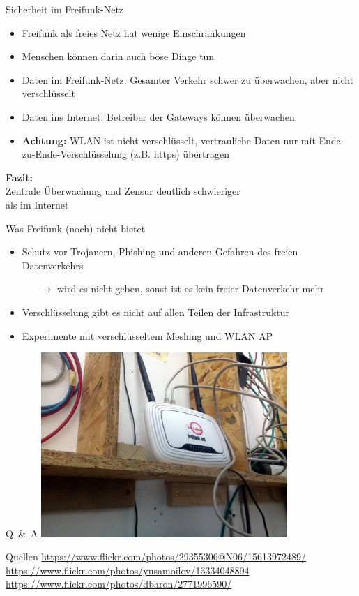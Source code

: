 \documentclass[10pt,handout]{beamer}
\begin{document}
\begin{frame}{Sicherheit im Freifunk-Netz}
	\begin{itemize}
		\pause\item Freifunk als freies Netz hat wenige Einschränkungen
		\pause\item Menschen können darin auch böse Dinge tun
		\vfill
		\pause\item Daten im Freifunk-Netz: Gesamter Verkehr schwer zu überwachen, aber nicht verschlüsselt
		\pause\item Daten ins Internet: Betreiber der Gateways können überwachen
		\vfill
		\pause\item \textbf{Achtung:} WLAN ist nicht verschlüsselt, vertrauliche Daten nur mit Ende-zu-Ende-Verschlüsselung (z.B. https) übertragen
		\vfill
	\end{itemize}
	\centering
	\textbf{Fazit:}\\Zentrale Überwachung und Zensur deutlich schwieriger \\ als im Internet
\end{frame}


\begin{frame}{Was Freifunk (noch) nicht bietet}
\vfill
\begin{itemize}
\pause\item Schutz vor Trojanern, Phishing und anderen Gefahren des freien Datenverkehrs
\begin{itemize}
\pause\item[$\rightarrow$] wird es nicht geben, sonst ist es kein freier Datenverkehr mehr
\end{itemize}
\vfill
\pause\item Verschlüsselung gibt es nicht auf allen Teilen der Infrastruktur
\vfill
\pause\item Experimente mit verschlüsseltem Meshing und WLAN AP
\end{itemize}
\vfill
\end{frame}

\begin{frame}{Q~\&~A}
\vfill
\centering
\includegraphics[width=0.7\textwidth]{images/irl_router}
\vfill
\end{frame}

\begin{frame}{Quellen}
\url{https://www.flickr.com/photos/29355306@N06/15613972489/}\\
\url{https://www.flickr.com/photos/yusamoilov/13334048894}\\
\url{https://www.flickr.com/photos/dbaron/2771996590/}
\end{frame}
\end{document}
